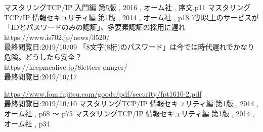 \def\line{−\hspace*{-.7zw}−}

\begin{thebibliography}{99}


 マスタリングTCP/IP 入門編 第5版 , 2016 , オーム社 , 序文,p11
 マスタリングTCP/IP 情報セキュリティ編 第1版 , 2014 , オーム社 , p18
 7割以上のサービスが「IDとパスワードのみの認証」、多要素認証の採用に遅れ\\ https://www.is702.jp/news/3520/ \\最終閲覧日:2019/10/09
 「8文字(8桁)のパスワード」は今では時代遅れでかなり危険。どうしたら安全？ \\ https://keepmealive.jp/8letters-danger/ \\最終閲覧日:2019/10/17

 \url{https://www.fom.fujitsu.com/goods/pdf/security/fpt1610-2.pdf} \\最終閲覧日:2019/10/10
 マスタリングTCP/IP 情報セキュリティ編 第1版 , 2014 , オーム社 , p68 〜 p75 
 マスタリングTCP/IP 情報セキュリティ編 第1版 , 2014 , オーム社 , p34 


\end{thebibliography}
